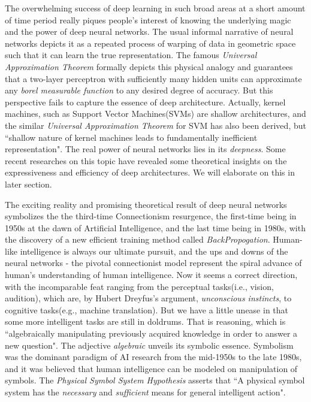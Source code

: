 \documentclass[letterpaper,10pt]{article}
\theoremstyle{definition}
\begin{document}
The overwhelming success of deep learning in such broad areas at a short amount
of time period really piques people's interest of knowing the underlying magic
and the power of deep neural networks. The usual informal
narrative of neural networks depicts it as a repeated process of warping of data
in geometric space such that it can learn the true representation. The famous
\emph{Universal Approximation Theorem}\cite{hornik1989multilayer, franklin1989approximate}
formally depicts this physical analogy and guarantees that a two-layer perceptron
with sufficiently many hidden units can approximate any \emph{borel measurable function}
to any desired degree of accuracy. But this perspective fails to capture the essence
of deep architecture. Actually, kernel machines, such as Support Vector Machines(SVMs)
are shallow architectures, and the similar \emph{Universal Approximation Theorem} for SVM has
also been derived\cite{hammer2003note}, but ``shallow nature of kernel machines leads
to fundamentally inefficient representation"\cite{bengio2007scaling}. The real power of
neural networks lies in its \emph{deepness}. Some recent researches on this topic have
revealed some theoretical insights on the expressiveness and efficiency of deep
architectures\cite{bianchini2014complexity, lin2016does, poggio2017and}. We will
elaborate on this in later section.

The exciting reality and promising theoretical result of deep neural networks symbolizes
the the third-time Connectionism resurgence, the first-time being in 1950s\cite{frank1957perceptron}
at the dawn of Artificial Intelligence, and the last time being in 1980s, with the discovery of
a new efficient training method called \textit{BackPropogation}\cite{rumelhart1988learning}.
Human-like intelligence is always our ultimate pursuit, and the ups and downs of the
neural networks - the pivotal connectionist model represent the spiral advance of human's
understanding of human intelligence. Now it seems a correct direction, with the incomparable feat
ranging from the perceptual tasks(i.e., vision, audition), which are, by Hubert Dreyfus's argument\cite{dreyfus1972computers},
\emph{unconscious instincts}, to cognitive tasks(e.g., machine translation). But we have a little
unease in that some more intelligent tasks are still in doldrums. That is reasoning, which is ``algebraically manipulating previously acquired knowledge
in order to answer a new question"\cite{bottou2014machine}. The adjective \emph{algebraic} unveils its
symbolic essence. Symbolism was the dominant paradigm of AI research from the mid-1950s to the late 1980s,
and it was believed that human intelligence can be modeled on manipulation of symbols. 
The \emph{Physical Symbol System Hypothesis}\cite{newell1980physical, newell1976computer} asserts that
``A physical symbol system has the \emph{necessary} and \emph{sufficient} means for general intelligent action".
\end{document}
